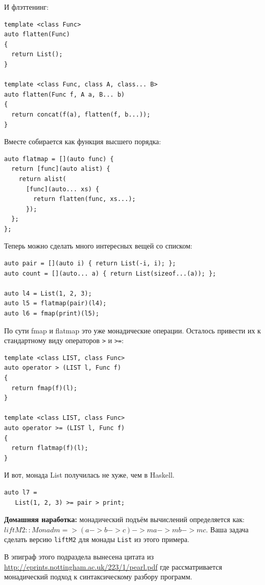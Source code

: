 \documentclass[a4paper,12pt,oneside]{article}
\begin{document}
И флэттенинг:
 
\begin{lstlisting}
template <class Func>
auto flatten(Func)
{
  return List(); 
}
 
template <class Func, class A, class... B>
auto flatten(Func f, A a, B... b)
{
  return concat(f(a), flatten(f, b...));
}
\end{lstlisting}
 
Вместе собирается как функция высшего порядка:

\begin{lstlisting}
auto flatmap = [](auto func) {
  return [func](auto alist) {
    return alist(
      [func](auto... xs) { 
        return flatten(func, xs...);  
      });
  };
};
\end{lstlisting}

Теперь можно сделать много интересных вещей со списком:
	
\begin{lstlisting}
auto pair = [](auto i) { return List(-i, i); };
auto count = [](auto... a) { return List(sizeof...(a)); };
 
auto l4 = List(1, 2, 3);
auto l5 = flatmap(pair)(l4);
auto l6 = fmap(print)(l5); 
\end{lstlisting}

По сути fmap и flatmap это уже монадические операции. Осталось привести их к стандартному виду операторов \lstinline!>! и \lstinline!>=!:

\begin{lstlisting}
template <class LIST, class Func>
auto operator > (LIST l, Func f)
{
  return fmap(f)(l);   
}
 
template <class LIST, class Func>
auto operator >= (LIST l, Func f)
{
  return flatmap(f)(l);   
}
\end{lstlisting}

И вот, монада List получилась не хуже, чем в Haskell.

\begin{lstlisting}
auto l7 = 
   List(1, 2, 3) >= pair > print;
\end{lstlisting}

\textbf{Домашняя наработка:} монадический подъём вычислений определяется как:
$liftM2 :: Monad m => (a -> b -> c) -> m a -> m b -> m c$.
Ваша задача сделать версию \lstinline!liftM2! для монады \lstinline!List! из этого примера.

В эпиграф этого подраздела вынесена цитата из \url{http://eprints.nottingham.ac.uk/223/1/pearl.pdf} где рассматривается монадический подход к синтаксическому разбору программ.
\end{document}
